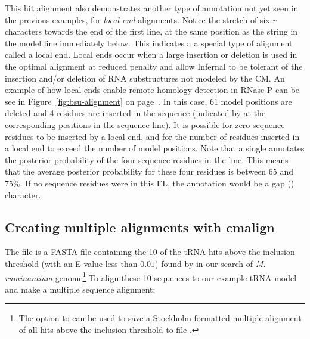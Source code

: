 This hit alignment also demonstrates another type of annotation not
yet seen in the previous examples, for \emph{local end}
alignments. Notice the stretch of six \verb+~+ characters towards the
end of the first  line, at the same position as the string
\otext{*[61]*} in the model line immediately below. This indicates a a
special type of alignment called a local end. Local ends occur when a
large insertion or deletion is used in the optimal alignment at
reduced penalty \citep{KleinEddy03} and allow Infernal to be tolerant
of the insertion and/or deletion of RNA substructures not modeled by
the CM. An example of how local ends enable remote homology detection
in RNase P can be see in Figure~\ref{fig:bsu-alignment} on
page~\pageref{fig:bsu-alignment}. In this case, 61 model positions are
deleted and 4 residues are inserted in the sequence (indicated by
\otext{*[ 4]*} at the corresponding positions in the sequence line).
It is possible for zero sequence residues to be inserted by a local
end, and for the number of residues inserted in a local end to exceed
the number of model positions. Note that a single  annotates
the posterior probability of the four sequence residues in the
 line. This means that the average posterior probability for
these four residues is between 65 and 75\%. If no sequence residues
were in this EL, the  annotation would be a gap ()
character.

\subsection{Creating multiple alignments with cmalign}
The file  is a FASTA file containing
the 10 of the tRNA hits above the inclusion threshold (with an E-value
less than $0.01$) found by  in our 
search of \emph{M. ruminantium} genome\footnote{The
   option to  can be used to save a
  Stockholm formatted multiple alignment of all hits above the
  inclusion threshold to file .}
To align these 10 sequences to our example tRNA model and make a multiple sequence
alignment:


